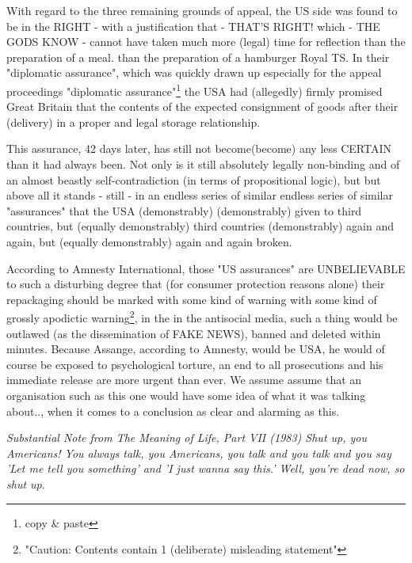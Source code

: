 \begin{multicols}{2}
With regard to the three remaining grounds of appeal, the US side was found to be in the RIGHT -
with a justification that - THAT'S RIGHT! which - THE GODS KNOW - cannot have taken much more
(legal) time for reflection than the preparation of a meal. than the preparation of a hamburger
Royal TS. In their "diplomatic assurance", which was quickly drawn up especially for the appeal
proceedings 
"diplomatic assurance"\footnote[30]{copy \& paste} the USA had (allegedly) firmly promised Great
 Britain that the contents of the expected consignment of goods after their (delivery) in a proper
 and legal storage relationship.

This assurance, 42 days later, has still not become(become) any less CERTAIN than it had always
been. Not only is it still absolutely legally non-binding and of an almost beastly
self-contradiction (in terms of propositional logic), but but above all it stands - still - in an
endless series of similar endless series of similar "assurances" that the USA (demonstrably)
(demonstrably) given to third countries, but (equally demonstrably) third countries
(demonstrably) again and again, but (equally demonstrably) again and again broken.

According to Amnesty International, those "US assurances" are UNBELIEVABLE to such a disturbing
degree that (for consumer protection reasons alone) their repackaging should be marked with some
kind of warning with some kind of grossly apodictic warning\footnote[31]{"Caution: Contents contain
1 (deliberate) misleading statement"}, in the in the antisocial media, such a thing would be
outlawed (as the dissemination of FAKE NEWS), banned and deleted within minutes. Because Assange,
according to Amnesty, would be USA, he would of course be exposed to psychological torture, an end
to all prosecutions and his immediate release are more urgent than ever. We assume assume that an
organisation such as this one would have some idea of what it was talking about.., when it comes to
a conclusion as clear and alarming as this.

\textit{Substantial Note from The Meaning of Life, Part VII (1983) Shut up, you Americans! You
 always talk, you Americans, you talk and you talk and you say 
'Let me tell you something' and 'I just wanna say this.' Well, you're dead now, so shut up}.




\end{multicols}
